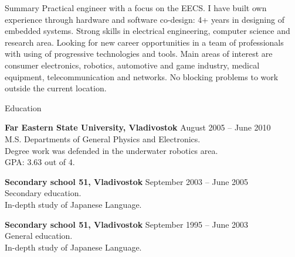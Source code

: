 \documentclass{template}
\begin{document}

\begin{rSection}{Summary}
Practical engineer with a focus on the EECS. I have built own experience through hardware and software co-design: 4+ years in designing of embedded systems. Strong skills in electrical engineering, computer science and research area. Looking for new career opportunities in a team of professionals with using of progressive technologies and tools. Main areas of interest are consumer electronics, robotics, automotive and game industry, medical equipment, telecommunication and networks. No blocking problems to work outside the current location.
\end{rSection}


\begin{rSection}{Education}

{\bf Far Eastern State University, Vladivostok} \hfill {August 2005 -- June 2010} \\ 
M.S. Departments of General Physics and Electronics. \\
Degree work was defended in the underwater robotics area. \\
GPA: 3.63 out of 4.

{\bf Secondary school 51, Vladivostok} \hfill {September 2003 -- June 2005} \\
Secondary education. \\
In-depth study of Japanese Language.

{\bf Secondary school 51, Vladivostok} \hfill {September 1995 -- June 2003} \\
General education. \\
In-depth study of Japanese Language.

\end{rSection}

\end{document}
